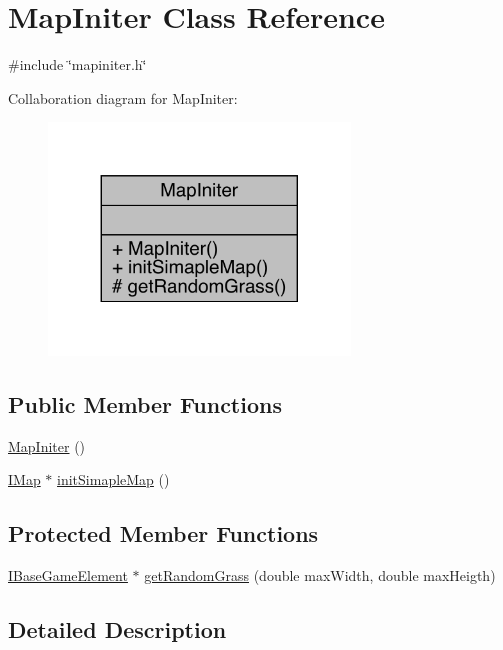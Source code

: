 \hypertarget{a00217}{}\section{Map\+Initer Class Reference}
\label{a00217}


{\ttfamily \#include \char`\"{}mapiniter.\+h\char`\"{}}



Collaboration diagram for Map\+Initer\+:
\nopagebreak
\begin{figure}[H]
\begin{center}
\leavevmode
\includegraphics[width=227pt]{d3/dd5/a00215}
\end{center}
\end{figure}
\subsection*{Public Member Functions}
\begin{DoxyCompactItemize}
\item 
\hyperlink{a00217_a1137dec968988621ea18091fdf379987}{Map\+Initer} ()
\item 
\hyperlink{a00165}{I\+Map} $\ast$ \hyperlink{a00217_ae6dfbed9cc8569db78442c0bfe57e252}{init\+Simaple\+Map} ()
\end{DoxyCompactItemize}
\subsection*{Protected Member Functions}
\begin{DoxyCompactItemize}
\item 
\hyperlink{a00137}{I\+Base\+Game\+Element} $\ast$ \hyperlink{a00217_a8961b80aa1df5f628bd4e28e66a51d0b}{get\+Random\+Grass} (double max\+Width, double max\+Heigth)
\end{DoxyCompactItemize}


\subsection{Detailed Description}


